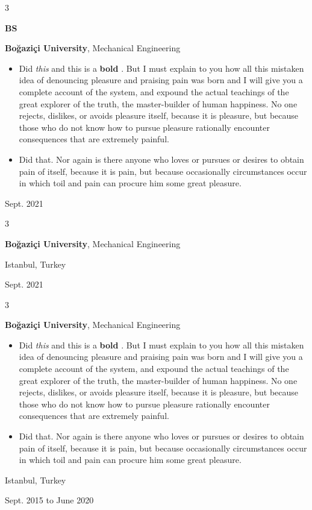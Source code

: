 \documentclass[10pt, letterpaper]{article}
\newenvironment{highlights}{
    \begin{itemize}[
        topsep=0.10 cm,
        parsep=0.10 cm,
        partopsep=0pt,
        itemsep=0pt,
        leftmargin=0.4 cm + 10pt
    ]
}{
    \end{itemize}
} %
\newenvironment{threecolentry}[3][]{
    \onecolentry
    \def\thirdColumn{#3}
    \setcolumnwidth{1 cm, \fill, 4.5 cm}
    \begin{paracol}{3}
    {\raggedright #2} \switchcolumn
}{
    \switchcolumn \raggedleft \thirdColumn
    \end{paracol}
    \endonecolentry
} %
\let\hrefWithoutArrow\href
\renewcommand{\href}[2]{\hrefWithoutArrow{#1}{\mbox{\ifthenelse{\equal{#2}{}}{ }{#2 }\raisebox{.15ex}{\footnotesize \faExternalLink*}}}}
\begin{document}
        \vspace{0.2 cm}

        \begin{threecolentry}{\textbf{BS}}{
            Sept. 2021
        }
            \textbf{Boğaziçi University}, Mechanical Engineering
            \begin{highlights}
                \item Did \textit{this} and this is a \textbf{bold} \href{https://example.com}{link}. But I must explain to you how all this mistaken idea of denouncing pleasure and praising pain was born and I will give you a complete account of the system, and expound the actual teachings of the great explorer of the truth, the master-builder of human happiness. No one rejects, dislikes, or avoids pleasure itself, because it is pleasure, but because those who do not know how to pursue pleasure rationally encounter consequences that are extremely painful.
                \item Did that. Nor again is there anyone who loves or pursues or desires to obtain pain of itself, because it is pain, but because occasionally circumstances occur in which toil and pain can procure him some great pleasure.
            \end{highlights}
        \end{threecolentry}

        \vspace{0.2 cm}

        \begin{threecolentry}{\textbf{}}{
            Istanbul, Turkey

        Sept. 2021
        }
            \textbf{Boğaziçi University}, Mechanical Engineering
        \end{threecolentry}

        \vspace{0.2 cm}

        \begin{threecolentry}{\textbf{}}{
            Istanbul, Turkey

        Sept. 2015 to June 2020
        }
            \textbf{Boğaziçi University}, Mechanical Engineering
            \begin{highlights}
                \item Did \textit{this} and this is a \textbf{bold} \href{https://example.com}{link}. But I must explain to you how all this mistaken idea of denouncing pleasure and praising pain was born and I will give you a complete account of the system, and expound the actual teachings of the great explorer of the truth, the master-builder of human happiness. No one rejects, dislikes, or avoids pleasure itself, because it is pleasure, but because those who do not know how to pursue pleasure rationally encounter consequences that are extremely painful.
                \item Did that. Nor again is there anyone who loves or pursues or desires to obtain pain of itself, because it is pain, but because occasionally circumstances occur in which toil and pain can procure him some great pleasure.
            \end{highlights}
        \end{threecolentry}
\end{document}
